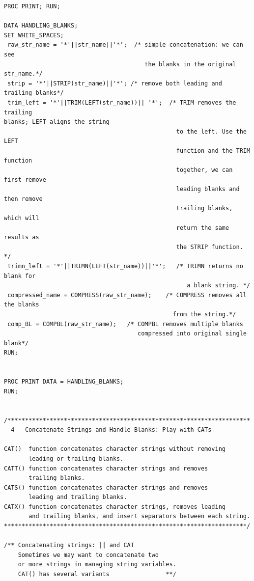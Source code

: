 \documentclass[
]{book}
\begin{document}
\begin{verbatim}
PROC PRINT; RUN;

DATA HANDLING_BLANKS;
SET WHITE_SPACES;
 raw_str_name = '*'||str_name||'*';  /* simple concatenation: we can see 
                                        the blanks in the original str_name.*/
 strip = '*'||STRIP(str_name)||'*'; /* remove both leading and trailing blanks*/
 trim_left = '*'||TRIM(LEFT(str_name))|| '*';  /* TRIM removes the trailing                                                              blanks; LEFT aligns the string 
                                                 to the left. Use the LEFT 
                                                 function and the TRIM function
                                                 together, we can first remove 
                                                 leading blanks and then remove 
                                                 trailing blanks, which will 
                                                 return the same results as 
                                                 the STRIP function.  */
 trimn_left = '*'||TRIMN(LEFT(str_name))||'*';   /* TRIMN returns no blank for 
                                                    a blank string. */
 compressed_name = COMPRESS(raw_str_name);    /* COMPRESS removes all the blanks 
                                                from the string.*/
 comp_BL = COMPBL(raw_str_name);   /* COMPBL removes multiple blanks
                                      compressed into original single blank*/
RUN;


PROC PRINT DATA = HANDLING_BLANKS;
RUN;


/*********************************************************************
  4   Concatenate Strings and Handle Blanks: Play with CATs

CAT()  function concatenates character strings without removing 
       leading or trailing blanks.
CATT() function concatenates character strings and removes 
       trailing blanks.
CATS() function concatenates character strings and removes 
       leading and trailing blanks.
CATX() function concatenates character strings, removes leading 
       and trailing blanks, and insert separators between each string.
*********************************************************************/

/** Concatenating strings: || and CAT
    Sometimes we may want to concatenate two
    or more strings in managing string variables.
    CAT() has several variants                **/


\end{verbatim}
\end{document}
